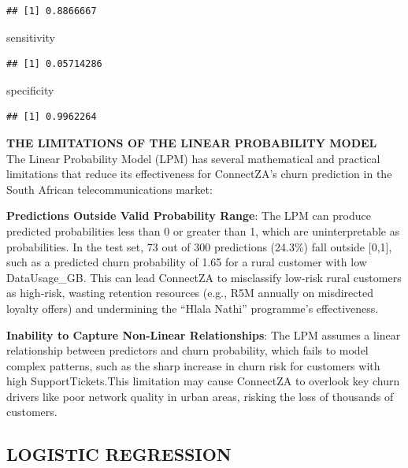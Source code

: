 \documentclass[
]{article}
\newenvironment{Shaded}{\begin{snugshade}}{\end{snugshade}}
\newcommand{\NormalTok}[1]{#1}
\begin{document}
\begin{verbatim}
## [1] 0.8866667
\end{verbatim}

\begin{Shaded}
\begin{Highlighting}[]
\NormalTok{sensitivity}
\end{Highlighting}
\end{Shaded}

\begin{verbatim}
## [1] 0.05714286
\end{verbatim}

\begin{Shaded}
\begin{Highlighting}[]
\NormalTok{specificity}
\end{Highlighting}
\end{Shaded}

\begin{verbatim}
## [1] 0.9962264
\end{verbatim}

\hfill\break
\textbf{THE LIMITATIONS OF THE LINEAR PROBABILITY MODEL}\\
The Linear Probability Model (LPM) has several mathematical and
practical limitations that reduce its effectiveness for ConnectZA's
churn prediction in the South African telecommunications market:

\textbf{Predictions Outside Valid Probability Range}: The LPM can
produce predicted probabilities less than 0 or greater than 1, which are
uninterpretable as probabilities. In the test set, 73 out of 300
predictions (24.3\%) fall outside {[}0,1{]}, such as a predicted churn
probability of 1.65 for a rural customer with low DataUsage\_GB. This
can lead ConnectZA to misclassify low-risk rural customers as high-risk,
wasting retention resources (e.g., R5M annually on misdirected loyalty
offers) and undermining the ``Hlala Nathi'' programme's effectiveness.

\textbf{Inability to Capture Non-Linear Relationships}: The LPM assumes
a linear relationship between predictors and churn probability, which
fails to model complex patterns, such as the sharp increase in churn
risk for customers with high SupportTickets.This limitation may cause
ConnectZA to overlook key churn drivers like poor network quality in
urban areas, risking the loss of thousands of customers.\\

\hypertarget{logistic-regression}{%
\subsection{LOGISTIC REGRESSION}\label{logistic-regression}}
\end{document}
